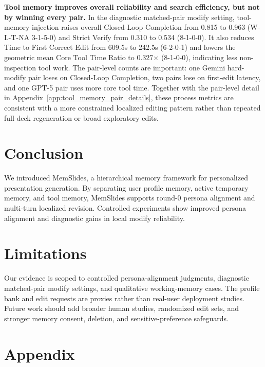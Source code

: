 \documentclass{llmxive}
\providecommand{\methodname}{MemSlides\xspace}
\begin{document}
\noindent\textbf{Tool memory improves overall reliability and search efficiency, but not by winning every pair.}
In the diagnostic matched-pair modify setting, tool-memory injection raises
overall Closed-Loop Completion from 0.815 to 0.963 (W-L-T-NA 3-1-5-0) and
Strict Verify from 0.310 to 0.534 (8-1-0-0). It also reduces Time to First
Correct Edit from 609.5s to 242.5s (6-2-0-1) and lowers the geometric mean
Core Tool Time Ratio to 0.327$\times$ (8-1-0-0), indicating less
non-inspection tool work. The pair-level counts are important: one Gemini
hard-modify pair loses on Closed-Loop Completion, two pairs lose on first-edit
latency, and one GPT-5 pair uses more core tool time. Together with the
pair-level detail in Appendix~\ref{app:tool_memory_pair_details}, these process
metrics are consistent with a more constrained localized editing pattern rather
than repeated full-deck regeneration or broad exploratory edits.

\FloatBarrier

\section{Conclusion}

We introduced \methodname, a hierarchical memory framework for personalized
presentation generation. By separating user profile memory, active temporary
memory, and tool memory, \methodname supports round-0 persona alignment and
multi-turn localized revision. Controlled experiments show improved persona
alignment and diagnostic gains in local modify reliability.

\section{Limitations}

Our evidence is scoped to controlled persona-alignment judgments, diagnostic
matched-pair modify settings, and qualitative working-memory cases. The profile
bank and edit requests are proxies rather than real-user deployment studies.
Future work should add broader human studies, randomized edit sets, and stronger
memory consent, deletion, and sensitive-preference safeguards.


{
\small


}


\appendix
\section{Appendix}
\end{document}

